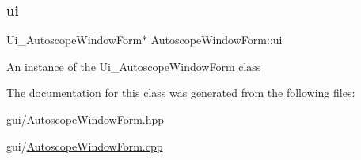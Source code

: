 \subsubsection{\texorpdfstring{ui}{ui}}
{\footnotesize\ttfamily Ui\+\_\+\+Autoscope\+Window\+Form$\ast$ Autoscope\+Window\+Form\+::ui\hspace{0.3cm}{\ttfamily [private]}}

An instance of the Ui\+\_\+\+Autoscope\+Window\+Form class 

The documentation for this class was generated from the following files\+:\begin{DoxyCompactItemize}
\item 
gui/\mbox{\hyperlink{_autoscope_window_form_8hpp}{Autoscope\+Window\+Form.\+hpp}}\item 
gui/\mbox{\hyperlink{_autoscope_window_form_8cpp}{Autoscope\+Window\+Form.\+cpp}}\end{DoxyCompactItemize}
